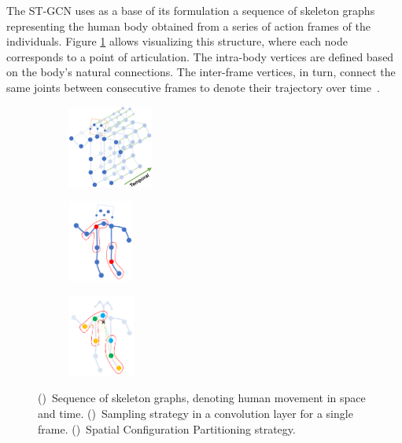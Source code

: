 The ST-GCN uses as a base of its formulation a sequence of skeleton graphs representing the human body obtained from a series of action frames of the individuals. Figure \ref{fig:st-gcn-graph} allows visualizing this structure, where each node corresponds to a point of articulation. The intra-body vertices are defined based on the body's natural connections. The inter-frame vertices, in turn, connect the same joints between consecutive frames to denote their trajectory over time~\cite{st-gcn-2018}.
    

\begin{figure}
    \centering
    \begin{subfigure}{.30\textwidth}
        \centering
        \includegraphics[height=2.7cm]{images/st_gcn_graph}
        \caption{}
        \label{fig:st-gcn-graph}
    \end{subfigure}
    \begin{subfigure}{.30\textwidth}
      \centering
      \includegraphics[height=2.7cm]{images/st_gcn_sampling}
      \caption{}
      \label{fig:st-gcn-sampling}
    \end{subfigure}
    \begin{subfigure}{.30\textwidth}
      \centering
      \includegraphics[height=2.7cm]{images/st_gcn_spatial_partitioning}
      \caption{}
      \label{fig:st-gcn-spatial-part}
    \end{subfigure}
    \caption{
        ()~Sequence of skeleton graphs, denoting human movement in space and time. 
        ()~Sampling strategy in a convolution layer for a single frame.
        ()~Spatial Configuration Partitioning strategy. \cite{st-gcn-2018}
    }
    \label{fig:graph_part_sampling}
\end{figure}


